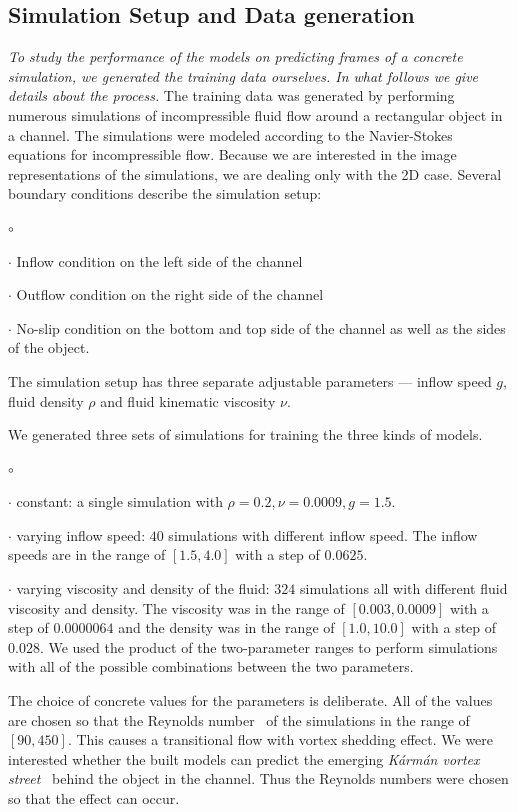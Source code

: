 \documentclass{llncs}
\begin{document}
\subsection{Simulation Setup and Data generation}
\emph{To study the performance of the models on predicting frames of a concrete simulation, we generated the training data ourselves. In what follows we give details about the process.} The training data was generated by performing numerous simulations of incompressible fluid flow around a rectangular object in a channel. The simulations were modeled according to the Navier-Stokes equations for incompressible flow. Because we are interested in the image representations of the simulations, we are dealing only with the 2D case. Several boundary conditions describe the simulation setup:
\begin{list}{$\circ$}{}
\item[$\cdot$] Inflow condition on the left side of the channel
\item[$\cdot$] Outflow condition on the right side of the channel
\item[$\cdot$] No-slip condition on the bottom and top side of the channel as well as the sides of the object.
\end{list}
The simulation setup has three separate adjustable parameters --- inflow speed $g$, fluid density $\rho$ and fluid kinematic viscosity $\nu$.

We generated three sets of simulations for training the three kinds of models.
\begin{list}{$\circ$}{}
\item[$\cdot$] constant: a single simulation with $\rho=0.2, \nu=0.0009, g=1.5$.
\item[$\cdot$] varying inflow speed: $40$ simulations with different inflow speed. The inflow speeds are in the range of $[1.5,4.0]$ with a step of $0.0625$.
\item[$\cdot$] varying viscosity and density of the fluid: $324$ simulations all with different fluid viscosity and density. The viscosity was in the range of $[0.003, 0.0009]$ with a step of $0.0000064$ and the density was in the range of $[1.0, 10.0]$ with a step of $0.028$. We used the product of the two-parameter ranges to perform simulations with all of the possible combinations between the two parameters.
\end{list}

The choice of concrete values for the parameters is deliberate. All of the values are chosen so that the Reynolds number~\cite{trinh2010critical} of the simulations in the range of $[90, 450]$. This causes a transitional flow with vortex shedding effect. We were interested whether the built models can predict the emerging \emph{Kármán vortex street}~\cite{karaman1911} behind the object in the channel. Thus the Reynolds numbers were chosen so that the effect can occur.
\end{document}
